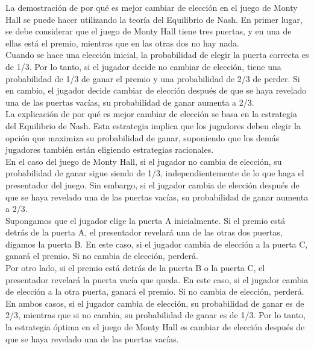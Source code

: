 La demostración de por qué es mejor cambiar de elección en el juego de Monty Hall se puede hacer 
utilizando la teoría del Equilibrio de Nash. En primer lugar, se debe considerar que el juego de 
Monty Hall tiene tres puertas, y en una de ellas está el premio, mientras que en las otras dos 
no hay nada.\\

Cuando se hace una elección inicial, la probabilidad de elegir la puerta correcta es de 1/3. 
Por lo tanto, si el jugador decide no cambiar de elección, tiene una probabilidad de 1/3 de ganar 
el premio y una probabilidad de 2/3 de perder. Si en cambio, el jugador decide cambiar de elección 
después de que se haya revelado una de las puertas vacías, su probabilidad de ganar aumenta a 2/3.\\

La explicación de por qué es mejor cambiar de elección se basa en la estrategia del Equilibrio de Nash. 
Esta estrategia implica que los jugadores deben elegir la opción que maximiza su probabilidad de ganar, 
suponiendo que los demás jugadores también están eligiendo estrategias racionales.\\

En el caso del juego de Monty Hall, si el jugador no cambia de elección, su probabilidad de ganar 
sigue siendo de 1/3, independientemente de lo que haga el presentador del juego. Sin embargo, 
si el jugador cambia de elección después de que se haya revelado una de las puertas vacías, su 
probabilidad de ganar aumenta a 2/3.\\

Supongamos que el jugador elige la puerta A inicialmente. Si el premio está detrás de la puerta A, 
el presentador revelará una de las otras dos puertas, digamos la puerta B. En este caso, 
si el jugador cambia de elección a la puerta C, ganará el premio. Si no cambia de elección, perderá.\\

Por otro lado, si el premio está detrás de la puerta B o la puerta C, el presentador revelará la 
puerta vacía que queda. En este caso, si el jugador cambia de elección a la otra puerta, 
ganará el premio. Si no cambia de elección, perderá.\\

En ambos casos, si el jugador cambia de elección, su probabilidad de ganar es de 2/3, mientras que 
si no cambia, su probabilidad de ganar es de 1/3. Por lo tanto, la estrategia óptima en el juego de
Monty Hall es cambiar de elección después de que se haya revelado una de las puertas vacías.\\

